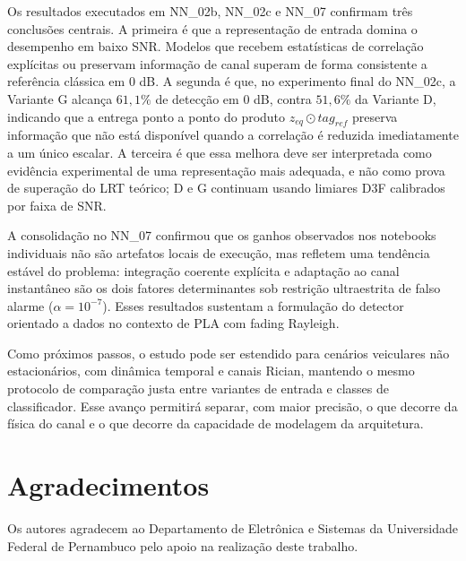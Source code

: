 \documentclass[12pt,a4paper]{article}
\begin{document}
Os resultados executados em NN\_02b, NN\_02c e NN\_07 confirmam três conclusões centrais. A primeira é que a representação de entrada domina o desempenho em baixo SNR. Modelos que recebem estatísticas de correlação explícitas ou preservam informação de canal superam de forma consistente a referência clássica em 0 dB. A segunda é que, no experimento final do NN\_02c, a Variante G alcança $61{,}1\%$ de detecção em 0 dB, contra $51{,}6\%$ da Variante D, indicando que a entrega ponto a ponto do produto $z_{eq}\odot tag_{ref}$ preserva informação que não está disponível quando a correlação é reduzida imediatamente a um único escalar. A terceira é que essa melhora deve ser interpretada como evidência experimental de uma representação mais adequada, e não como prova de superação do LRT teórico; D e G continuam usando limiares D3F calibrados por faixa de SNR.

A consolidação no NN\_07 confirmou que os ganhos observados nos notebooks individuais não são artefatos locais de execução, mas refletem uma tendência estável do problema: integração coerente explícita e adaptação ao canal instantâneo são os dois fatores determinantes sob restrição ultraestrita de falso alarme ($\alpha=10^{-7}$). Esses resultados sustentam a formulação do detector orientado a dados no contexto de PLA com fading Rayleigh.

Como próximos passos, o estudo pode ser estendido para cenários veiculares não estacionários, com dinâmica temporal e canais Rician, mantendo o mesmo protocolo de comparação justa entre variantes de entrada e classes de classificador. Esse avanço permitirá separar, com maior precisão, o que decorre da física do canal e o que decorre da capacidade de modelagem da arquitetura.

\section*{Agradecimentos}
Os autores agradecem ao Departamento de Eletrônica e Sistemas da Universidade Federal de Pernambuco pelo apoio na realização deste trabalho.
\end{document}
